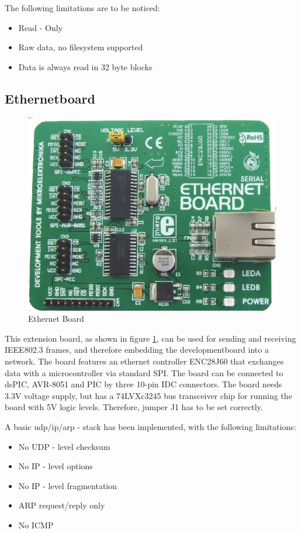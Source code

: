 

The following limitations are to be noticed:

\begin{itemize}
 \item Read - Only
 \item Raw data, no filesystem supported
 \item Data is always read in 32 byte blocks
\end{itemize}




\subsection{Ethernetboard}


\begin{figure}[h]
 \centerline{\includegraphics[width=.5\columnwidth]{pics/Ethernetboard.png}}
  \caption{Ethernet Board}
  \label{fig:ethernetboard}
\end{figure}

This extension board, as shown in figure \ref{fig:ethernetboard}, can be used for sending and receiving IEEE802.3 frames, and therefore embedding the developmentboard into a network. The board features an ethernet controller ENC28J60 that exchanges data with a microcontroller via standard SPI. The board can be connected to dsPIC, AVR-8051 and PIC by three 10-pin IDC connectors. The board needs 3.3V voltage supply, but has a 74LVXc3245 bus transceiver chip for running the board with 5V logic levels. Therefore, jumper J1 has to be set correctly.

A basic udp/ip/arp - stack has been implemented, with the following limitations:

\begin{itemize}
 \item No UDP - level checksum
 \item No IP - level options
 \item No IP - level fragmentation
 \item ARP request/reply only
 \item No ICMP
\end{itemize}

